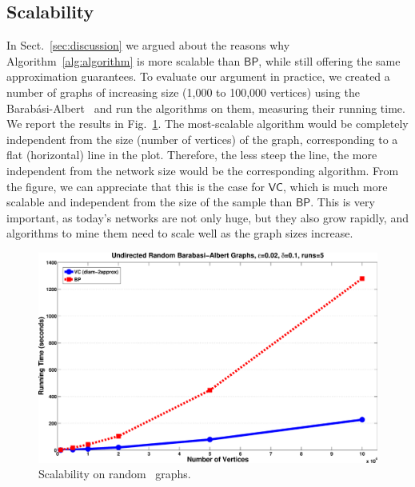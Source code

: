 \subsection{Scalability}\label{sec:scalability}

In Sect.~\ref{sec:discussion} we argued about the reasons why
Algorithm~\ref{alg:algorithm} is more scalable than $\mathsf{BP}$, while still
offering the same approximation guarantees. To evaluate our argument in practice, we
created a number of graphs of increasing size (1,000 to 100,000 vertices) using
the Barab\'asi-Albert~\citep{BarabasiA99} and run the algorithms on them,
measuring their running time. We report the results in Fig.~\ref{fig:random:time}.
The most-scalable algorithm would be completely independent from the size
(number of vertices) of the graph, corresponding to a flat (horizontal) line in
the plot. Therefore, the less steep the line, the more independent from the
network size would be the corresponding algorithm. From the figure, we can
appreciate that this is the case for $\mathsf{VC}$, which is much more scalable
and independent from the size of the sample than $\mathsf{BP}$. This is very
important, as today's networks are not only huge, but they also grow rapidly,
and algorithms to mine them need to scale well as
the graph sizes increase.
\begin{figure}[ht]
  \centering
  \includegraphics[width=.45\textwidth,keepaspectratio]{figures/eps/random-time}
  \caption{Scalability on random~\citep{BarabasiA99} graphs.}
  \label{fig:random:time}
\end{figure}


